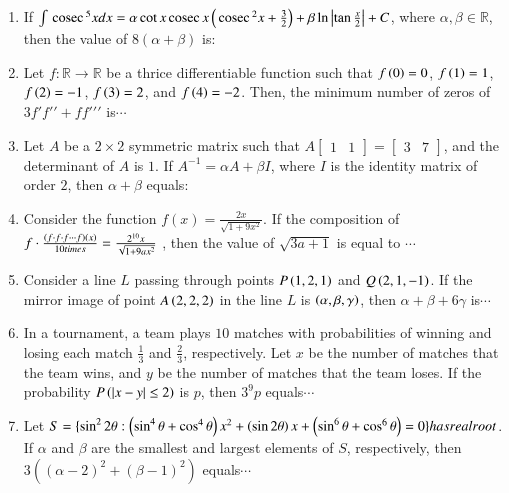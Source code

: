 \documentclass[journal,12pt,twocolumn]{IEEEtran}
\theoremstyle{remark}
\begin{document}
\begin{enumerate}[start=16]
    \item If $\int \,\text{cosec}\,^5 x dx = \alpha \cot x \,\text{cosec}\, x\left(\,\text{cosec}\,^2 x +\frac{3}{2}\right) + \beta\ln\left\vert \tan \frac{x}{2}\right\vert + C$, where $\alpha, \beta \in \mathbb{R}$, then the value of $8(\alpha + \beta)$ is:
    

    \item Let $f : \mathbb{R} \to \mathbb{R}$ be a thrice differentiable function such that $f\left(0\right) = 0$, $f\left(1\right) = 1$, $f\left(2\right) = -1$, $f\left(3\right) = 2$, and $f\left(4\right) = -2$. Then, the minimum number of zeros of $3f\prime f\prime\prime+ff\prime\prime\prime$ is$\cdots$
    

    \item Let $A$ be a $2 \times 2$ symmetric matrix such that $A  \begin{bmatrix} 1 & 1 \end{bmatrix}=\begin{bmatrix} 3 & 7     \end{bmatrix}$, and the determinant of $A$ is $1$. If $A^{-1} = \alpha A + \beta I$, where $I$ is the identity matrix of order $2$, then $\alpha + \beta$ equals:
   
    \item Consider the function $f(x) = \frac{2x}{\sqrt{1 + 9x^2}}$. If the composition of $f\cdot\frac{\left(f\cdot f \cdot f \cdots f\right)\left(x\right)}{10 times}=\frac{2^{10}x}{\sqrt{1+9ax^2}}$ , then the value of $\sqrt{3a+1}$ is equal to $\cdots$
    

    \item Consider a line $L$ passing through points $P\left(1, 2, 1\right)$ and $Q\left(2, 1, -1\right)$. If the mirror image of point $A\left(2, 2, 2\right)$ in the line $L$ is $\left(\alpha, \beta, \gamma\right)$, then $\alpha + \beta + 6\gamma$ is$\cdots$
    

    \item In a tournament, a team plays $10$ matches with probabilities of winning and losing each match $\frac{1}{3}$ and $\frac{2}{3}$, respectively. Let $x$ be the number of matches that the team wins, and $y$ be the number of matches that the team loses. If the probability $P\left(\left\vert x - y\right\vert \leq 2\right)$ is $p$, then $3^9p$ equals$\cdots$
   

    \item Let $S = \{ \sin^2 2\theta:\left(\sin^4 \theta +\cos^4
    \theta\right)x^2+\left( \sin2 \theta\right)x +\left(\sin^6 \theta+  \cos^6\theta\right) = 0 \} has real root$. If $\alpha$ and $\beta$ are the smallest and largest elements of $S$, respectively, then $3((\alpha - 2)^2 + (\beta - 1)^2)$ equals$\cdots$
    



\end{enumerate}
\end{document}
